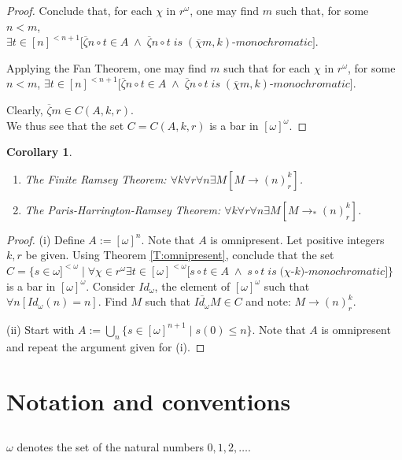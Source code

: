 \documentclass[a4paper]{amsart}
\theoremstyle{plain}
\newtheorem{corollary}[theorem]{Corollary}
\begin{document}
\begin{proof}
	Conclude that, for each $\chi$ in $r^\omega$, one may find $m$ such that, for some $n<m$, \\$\exists t \in [n]^{<n+1}[\overline \zeta n \circ t \in A \;\wedge\; \overline \zeta n \circ t \;is\;(\overline \chi m, k)$-$monochromatic]$.
	
	Applying the Fan Theorem, one may find $m$ such that for each $\chi$ in $r^\omega$, for some $n<m$, $\exists t \in [n]^{<n+1}[\overline \zeta n \circ t \in A \;\wedge\; \overline \zeta n \circ t \;is\;(\overline \chi m, k)$-$monochromatic]$.
	
	Clearly, $\overline \zeta m \in C(A,k,r)$. 
	\\We thus see that the set $C=C(A,k,r)$ is a bar in $[\omega]^\omega$.  \end{proof}
	
	\begin{corollary}\label{C:finiteramsey}$\;$ \begin{enumerate}[\upshape (i)] \item The Finite Ramsey Theorem: $\forall k \forall r \forall n \exists M[M\rightarrow (n)^k_r]$. \item The Paris-Harrington-Ramsey Theorem: $\forall k \forall r \forall n \exists M[M\rightarrow_\ast (n)^k_r]$. \end{enumerate} \end{corollary}
	
	\begin{proof} (i) Define $A:=[\omega]^n$. Note that $A$ is omnipresent. Let positive integers $k,r$ be given. Using Theorem \ref{T:omnipresent}, conclude that the set \\$C=\{s\in \omega]^{<\omega}\mid \forall \chi \in r^\omega\exists t\in [\omega]^{<\omega}[s\circ t \in A\;\wedge\; s\circ t\; is\; (\chi$-$k)$-$monochromatic]\}$ is a bar in $[\omega]^\omega$. Consider $Id_\omega$, the element of $[\omega]^\omega$ such that $\forall n[Id_\omega(n)=n]$. Find $M$ such that $\overline{Id_\omega}M \in C$ and note: $M\rightarrow (n)^k_r$.
	
	(ii) Start with $A:=\bigcup_n \{s\in [\omega]^{n+1}\mid s(0) \le n\}$. Note that $A$ is omnipresent  and repeat the argument given for (i). \end{proof}
	
	\section{Notation and conventions}\label{S:notat}
\subsection{} $\omega$ denotes the set of the natural numbers $0,1,2,\ldots$.
 
\end{document}
